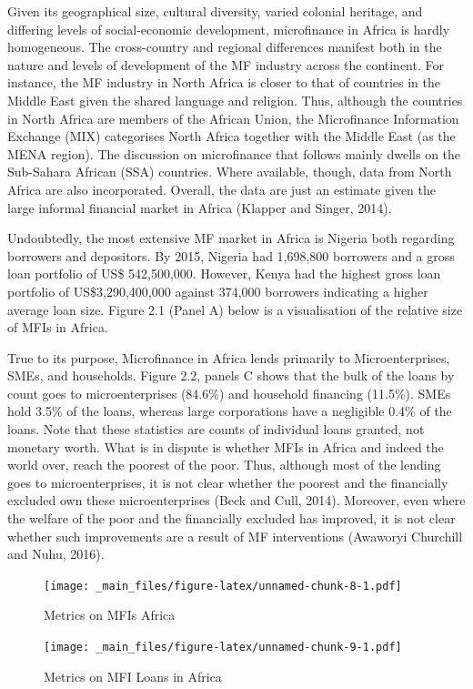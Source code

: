 \documentclass[a4paper, nobind]{templates/ociamthesis}
\begin{document}
\noindent Given its geographical size, cultural diversity, varied colonial heritage, and differing levels of social-economic development, microfinance in Africa is hardly homogeneous. The cross-country and regional differences manifest both in the nature and levels of development of the MF industry across the continent. For instance, the MF industry in North Africa is closer to that of countries in the Middle East given the shared language and religion. Thus, although the countries in North Africa are members of the African Union, the Microfinance Information Exchange (MIX) categorises North Africa together with the Middle East (as the MENA region). The discussion on microfinance that follows mainly dwells on the Sub-Sahara African (SSA) countries. Where available, though, data from North Africa are also incorporated. Overall, the data are just an estimate given the large informal financial market in Africa (Klapper and Singer, 2014).

Undoubtedly, the most extensive MF market in Africa is Nigeria both regarding borrowers and depositors. By 2015, Nigeria had 1,698,800 borrowers and a gross loan portfolio of US\$ 542,500,000. However, Kenya had the highest gross loan portfolio of US\$3,290,400,000 against 374,000 borrowers indicating a higher average loan size. Figure 2.1 (Panel A) below is a visualisation of the relative size of MFIs in Africa.

True to its purpose, Microfinance in Africa lends primarily to Microenterprises, SMEs, and households. Figure 2.2, panels C shows that the bulk of the loans by count goes to microenterprises (84.6\%) and household financing (11.5\%). SMEs hold 3.5\% of the loans, whereas large corporations have a negligible 0.4\% of the loans. Note that these statistics are counts of individual loans granted, not monetary worth. What is in dispute is whether MFIs in Africa and indeed the world over, reach the poorest of the poor. Thus, although most of the lending goes to microenterprises, it is not clear whether the poorest and the financially excluded own these microenterprises (Beck and Cull, 2014). Moreover, even where the welfare of the poor and the financially excluded has improved, it is not clear whether such improvements are a result of MF interventions (Awaworyi Churchill and Nuhu, 2016).

\newpage
\begin{landscape}

\begin{figure}
\centering
\texttt{[image: \_main\_files/figure-latex/unnamed-chunk-8-1.pdf]}
\caption{\label{fig:unnamed-chunk-8}Metrics on MFIs Africa}
\end{figure}

\newpage

\begin{figure}
\centering
\texttt{[image: \_main\_files/figure-latex/unnamed-chunk-9-1.pdf]}
\caption{\label{fig:unnamed-chunk-9}Metrics on MFI Loans in Africa}
\end{figure}

\end{landscape}
\newpage
\end{document}
